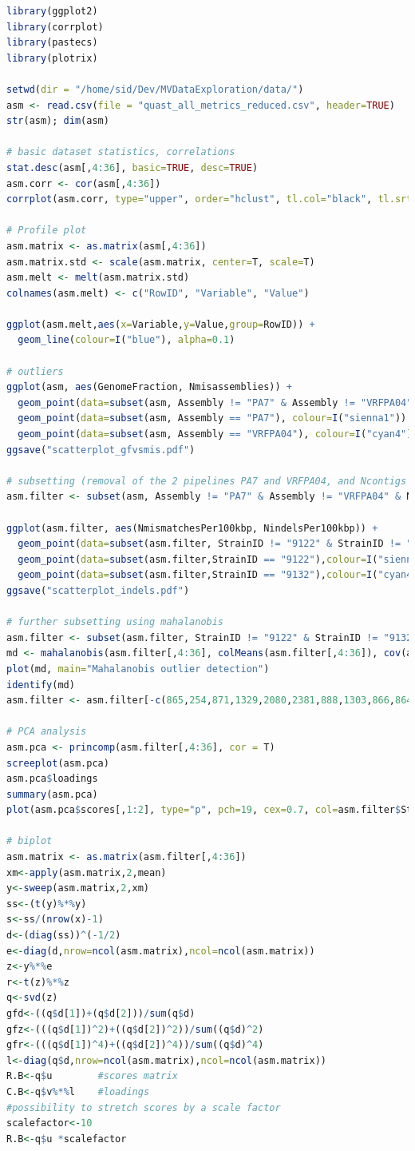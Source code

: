 \documentclass[11pt, a4paper,titlepage]{article}
\begin{document}
\begin{lstlisting}[language=R]
library(ggplot2)
library(corrplot)
library(pastecs)
library(plotrix)

setwd(dir = "/home/sid/Dev/MVDataExploration/data/")
asm <- read.csv(file = "quast_all_metrics_reduced.csv", header=TRUE)
str(asm); dim(asm)

# basic dataset statistics, correlations
stat.desc(asm[,4:36], basic=TRUE, desc=TRUE)
asm.corr <- cor(asm[,4:36])
corrplot(asm.corr, type="upper", order="hclust", tl.col="black", tl.srt=90)

# Profile plot 
asm.matrix <- as.matrix(asm[,4:36]) 
asm.matrix.std <- scale(asm.matrix, center=T, scale=T) 
asm.melt <- melt(asm.matrix.std)
colnames(asm.melt) <- c("RowID", "Variable", "Value")

ggplot(asm.melt,aes(x=Variable,y=Value,group=RowID)) +
  geom_line(colour=I("blue"), alpha=0.1)

# outliers
ggplot(asm, aes(GenomeFraction, Nmisassemblies)) +
  geom_point(data=subset(asm, Assembly != "PA7" & Assembly != "VRFPA04"), colour=I("blue"),alpha=0.5) +
  geom_point(data=subset(asm, Assembly == "PA7"), colour=I("sienna1")) +
  geom_point(data=subset(asm, Assembly == "VRFPA04"), colour=I("cyan4"))
ggsave("scatterplot_gfvsmis.pdf")

# subsetting (removal of the 2 pipelines PA7 and VRFPA04, and Ncontigs > 400)
asm.filter <- subset(asm, Assembly != "PA7" & Assembly != "VRFPA04" & Ncontigs < 400)

ggplot(asm.filter, aes(NmismatchesPer100kbp, NindelsPer100kbp)) +
  geom_point(data=subset(asm.filter, StrainID != "9122" & StrainID != "9132"), colour=I("blue"),alpha=0.5) +
  geom_point(data=subset(asm.filter,StrainID == "9122"),colour=I("sienna1")) +
  geom_point(data=subset(asm.filter,StrainID == "9132"),colour=I("cyan4"))
ggsave("scatterplot_indels.pdf")

# further subsetting using mahalanobis
asm.filter <- subset(asm.filter, StrainID != "9122" & StrainID != "9132" & Ncontigs < 400)
md <- mahalanobis(asm.filter[,4:36], colMeans(asm.filter[,4:36]), cov(asm.filter[,4:36]))
plot(md, main="Mahalanobis outlier detection")
identify(md)
asm.filter <- asm.filter[-c(865,254,871,1329,2080,2381,888,1303,866,864),]

# PCA analysis
asm.pca <- princomp(asm.filter[,4:36], cor = T)
screeplot(asm.pca)
asm.pca$loadings
summary(asm.pca)
plot(asm.pca$scores[,1:2], type="p", pch=19, cex=0.7, col=asm.filter$StrainID)

# biplot
asm.matrix <- as.matrix(asm.filter[,4:36])
xm<-apply(asm.matrix,2,mean)
y<-sweep(asm.matrix,2,xm)
ss<-(t(y)%*%y)
s<-ss/(nrow(x)-1)
d<-(diag(ss))^(-1/2)
e<-diag(d,nrow=ncol(asm.matrix),ncol=ncol(asm.matrix))
z<-y%*%e
r<-t(z)%*%z
q<-svd(z)
gfd<-((q$d[1])+(q$d[2]))/sum(q$d)
gfz<-(((q$d[1])^2)+((q$d[2])^2))/sum((q$d)^2)
gfr<-(((q$d[1])^4)+((q$d[2])^4))/sum((q$d)^4)
l<-diag(q$d,nrow=ncol(asm.matrix),ncol=ncol(asm.matrix))
R.B<-q$u        #scores matrix
C.B<-q$v%*%l    #loadings
#possibility to stretch scores by a scale factor
scalefactor<-10
R.B<-q$u *scalefactor


\end{lstlisting}
\end{document}
